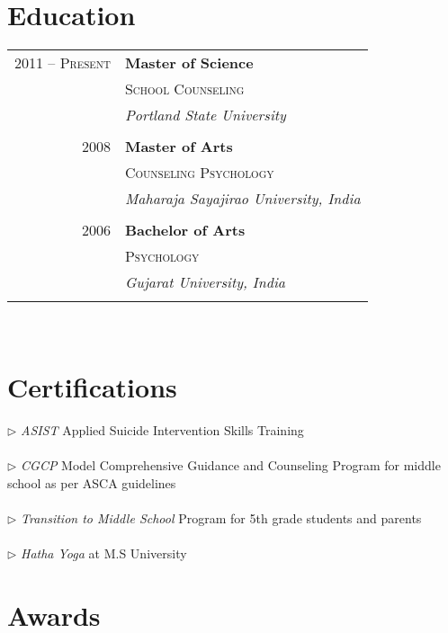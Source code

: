 \documentclass[10pt]{article} %
\begin{document}
{\begin{minipage}[t]{0.44\textwidth}

\section{Education} 

\begin{tabular}{rl} %

2011 -- \textsc{Present} & \textbf{Master of Science} \\ 
& \textsc{School Counseling} \\ 
& \textit{Portland State University}\\
&\\
	 
2008 & \textbf{Master of Arts} \\ 
& \textsc{Counseling Psychology} \\ 
& \textit{Maharaja Sayajirao University, India}\\
&\\
	 
2006 & \textbf{Bachelor of Arts}\\
& \textsc{Psychology} \\
& \textit{Gujarat University, India}\\
&\\
	 
\end{tabular}\\[10pt]

\section{Certifications} 
$\triangleright$ \textit{ASIST} Applied Suicide Intervention Skills Training \\
\\
$\triangleright$ \textit{CGCP} Model Comprehensive Guidance and Counseling Program for middle school as per ASCA guidelines \\
\\
$\triangleright$ \textit{Transition to Middle School} Program for 5th grade students and parents \\
\\
$\triangleright$ \textit{Hatha Yoga} at M.S University\\

\section{Awards} 


\end{minipage}}
\end{document}
